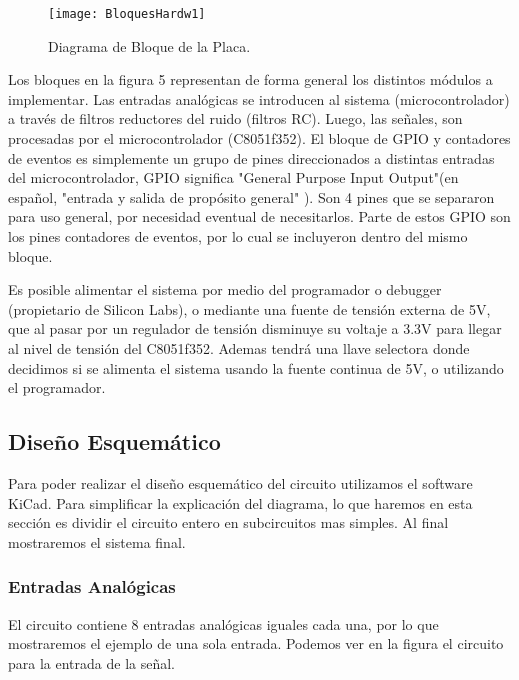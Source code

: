 \begin{figure}[h]
  \centering
  \texttt{[image: BloquesHardw1]}
  \caption{Diagrama de Bloque de la Placa.}\label{fig:BloquesHardw1}
\end{figure}

Los bloques en la figura 5 representan de forma general los distintos módulos a implementar. Las entradas analógicas se introducen al sistema (microcontrolador) a través de filtros reductores del ruido (filtros RC). Luego, las señales, son procesadas por el microcontrolador (C8051f352). El bloque de GPIO y contadores de eventos es simplemente un grupo de pines direccionados a distintas entradas del microcontrolador, GPIO significa "General Purpose Input Output"(en español, "entrada y salida de propósito general" ). Son 4 pines que se separaron para uso general, por necesidad eventual de necesitarlos. Parte de estos GPIO son los pines contadores de eventos, por lo cual se incluyeron dentro del mismo bloque.

Es posible alimentar el sistema por medio del programador o debugger (propietario de Silicon Labs), o mediante una fuente de tensión externa de 5V, que al pasar por un regulador de tensión disminuye su voltaje a 3.3V para llegar al nivel de tensión del C8051f352. Ademas tendrá una llave selectora donde decidimos si se alimenta el sistema usando la fuente continua de 5V, o utilizando el programador.


\subsection{Diseño Esquemático}
\label{diseno_esquematico}

Para poder realizar el diseño esquemático del circuito utilizamos el software KiCad. Para simplificar la explicación del diagrama, lo que haremos en esta sección es dividir el circuito entero en subcircuitos mas simples. Al final mostraremos el sistema final.

\subsubsection{Entradas Analógicas}
\label{entradas_analogicas}

El circuito contiene 8 entradas analógicas iguales cada una, por lo que mostraremos el ejemplo de una sola entrada. Podemos ver en la figura  el circuito para la entrada de la señal. 


